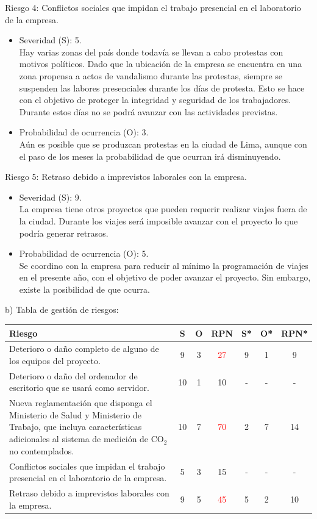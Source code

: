 \documentclass[
11pt, %
]{charter}
\begin{document}
Riesgo 4: Conflictos sociales que impidan el trabajo presencial en el laboratorio de la empresa.
\begin{itemize}
	\item Severidad (S): 5.\\
	 Hay varias zonas del país donde todavía se llevan a cabo protestas con motivos políticos. Dado que la ubicación de la empresa se encuentra en una zona propensa a actos de vandalismo durante las protestas, siempre se suspenden las labores presenciales durante los días de protesta. Esto se hace con el objetivo de proteger la integridad y seguridad de los trabajadores. Durante estos días no se podrá avanzar con las actividades previstas.
	\item Probabilidad de ocurrencia (O): 3.\\
	Aún es posible que se produzcan protestas en la ciudad de Lima, aunque con el paso de los meses la probabilidad de que ocurran irá disminuyendo. 
\end{itemize} 


Riesgo 5: Retraso debido a imprevistos laborales con la empresa.
\begin{itemize}
	\item Severidad (S): 9.\\
	La empresa tiene otros proyectos que pueden requerir realizar viajes fuera de la ciudad. Durante los viajes será imposible avanzar con el proyecto lo que podría generar retrasos.
	\item Probabilidad de ocurrencia (O): 5.\\
	Se coordino con la empresa para reducir al mínimo la programación de viajes en el presente año, con el objetivo de poder avanzar el proyecto. Sin embargo, existe la posibilidad de que ocurra.
\end{itemize} 
 

b) Tabla de gestión de riesgos:

\begin{table}[htpb]
\centering
\begin{tabularx}{\linewidth}{@{}|X|c|c|c|c|c|c|@{}}
\hline
\rowcolor[HTML]{C0C0C0} 
Riesgo & S & O & RPN & S* & O* & RPN* \\ \hline
Deterioro o daño completo de alguno de los equipos del proyecto.&9&3&\textcolor{red}{27}&9&1&9      \\ \hline
Deterioro o daño del ordenador de escritorio que se usará como servidor.&10&1&10&-&-&-     \\ \hline
Nueva reglamentación que disponga el Ministerio de Salud y Ministerio de Trabajo, que incluya características adicionales al sistema de medición de CO$_{2}$ no contemplados.&10&7&\textcolor{red}{70}&2&7&14    \\ \hline
Conflictos sociales que impidan el trabajo presencial en el laboratorio de la empresa.&5&3&15&-&-&-    \\ \hline
Retraso debido a imprevistos laborales con la empresa.&9&5&\textcolor{red}{45}&5&2&10     \\ \hline
\end{tabularx}%
\end{table}
\end{document}
